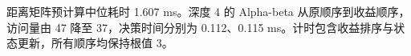 距离矩阵预计算中位耗时 1.607 ms。深度 4 的 Alpha-beta 从原顺序到收益顺序，访问量由 47 降至 37，决策时间分别为 0.112、0.115 ms。计时包含收益排序与状态更新，所有顺序均保持根值 3。
